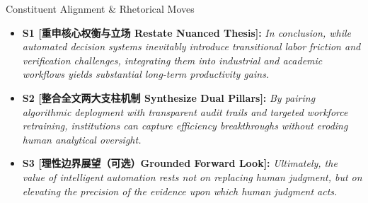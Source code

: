 \begin{TipBox}{Constituent Alignment \& Rhetorical Moves}
\begin{itemize}[leftmargin=1.5em]
  \item \textbf{S1 [重申核心权衡与立场 Restate Nuanced Thesis]:} \textit{In conclusion, while automated decision systems inevitably introduce transitional labor friction and verification challenges, integrating them into industrial and academic workflows yields substantial long-term productivity gains.}\par{}
  \item \textbf{S2 [整合全文两大支柱机制 Synthesize Dual Pillars]:} \textit{By pairing algorithmic deployment with transparent audit trails and targeted workforce retraining, institutions can capture efficiency breakthroughs without eroding human analytical oversight.}\par{}
  \item \textbf{S3 [理性边界展望（可选）Grounded Forward Look]:} \textit{Ultimately, the value of intelligent automation rests not on replacing human judgment, but on elevating the precision of the evidence upon which human judgment acts.}\par{}
\end{itemize}
\end{TipBox}
\bigskip
